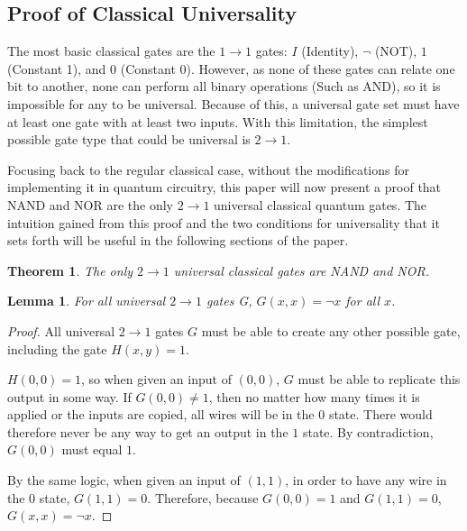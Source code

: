 \documentclass[12pt]{article}
\begin{document}
\subsection{Proof of Classical Universality}
The most basic classical gates are the $1 \to 1$ gates: $I$ (Identity),  $\neg$ (NOT), $1$ (Constant 1), and $0$ (Constant 0). However, as none of these gates can relate one bit to another, none can perform all binary operations (Such as AND), so it is impossible for any to be universal. Because of this, a universal gate set must have at least one gate with at least two inputs.
With this limitation, the simplest possible gate type that could be universal is $2 \to 1$.

Focusing back to the regular classical case, without the modifications for implementing it in quantum circuitry, this paper will now present a proof that NAND and NOR are the only $2 \to 1$ universal classical quantum gates. The intuition gained from this proof and the two conditions for universality that it sets forth will be useful in the following sections of the paper.


\newtheorem{theorem}{Theorem}
\newtheorem{lemma}{Lemma}
\newtheorem{corollary}{Corollary}

\begin{theorem}
    The only $2 \to 1$ universal classical gates are NAND and NOR.
\end{theorem}

\begin{lemma}
    For all universal $2 \to 1$ gates G, $G(x, x) = \neg x$ for all $x$.
\end{lemma}

\begin{proof}
    All universal $2 \to 1$ gates $G$ must be able to create any other possible gate, including the gate $H(x, y) = 1$.

    $H(0, 0) = 1$, so when given an input of $(0, 0)$, $G$ must be able to replicate this output in some way. If $G(0, 0) \ne 1$, then no matter how many times it is applied or the inputs are copied, all wires will be in the $0$ state. There would therefore never be any way to get an output in the $1$ state. By contradiction, $G(0, 0)$ must equal $1$.
    
    By the same logic, when given an input of $(1, 1)$, in order to have any wire in the $0$ state, $G(1, 1) = 0$.
    Therefore, because $G(0, 0) = 1$ and $G(1, 1) = 0$, $G(x, x) = \neg x$. 
\end{proof}
\end{document}
